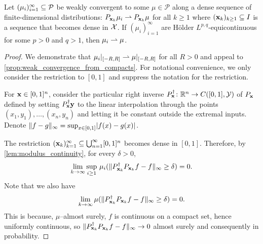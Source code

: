 \documentclass[12pt]{report}
\begin{document}
\begin{proposition} \label{prop:weak_convergence_from_fdds}
    Let $(\mu_i)_{i=1}^\infty \subseteq \mathcal{P}$ be weakly convergent to some $\mu \in \mathcal{P}$ along a dense sequence of finite-dimensional distributions: $P_{\mathbf{x}_k} \mu_i \rightharpoonup P_{\mathbf{x}_k} \mu$ for all $k \ge 1$ where $(\mathbf{x}_k)_{k \ge 1} \subseteq I$ is a sequence that becomes dense in $\mathcal{X}$.
    If $(\mu_i)_{i=1}^\infty$ are H\"older $L^{p,q}$-equicontinuous for some $p > 0$ and $q > 1$, then $\mu_i \rightharpoonup \mu$.
\end{proposition}
\begin{proof}
    We demonstrate that $\mu_i|_{[-R, R]} \rightharpoonup \mu|_{[-R, R]}$ for all $R > 0$ and appeal to \cref{prop:weak_convergence_from_compacts}.
    For notational convenience, we only consider the restriction to $[0, 1]$ and suppress the notation for the restriction.

    For $\mathbf{x} \in [0, 1]^n$, consider the particular right inverse $P_{\mathbf{x}}^\dagger \colon \mathbb{R}^n \to C([0, 1], \mathcal{Y})$ of $P_{\mathbf{x}}$ defined by setting $P_{\mathbf{x}}^\dagger \mathbf{y}$ to the linear interpolation through the points $(x_1,y_1), \ldots, (x_n, y_n)$ and letting it be constant outside the extremal inputs.
    Denote $\lVert f - g\rVert_\infty = \operatorname*{sup}_{x\in [0, 1]} \lvert f(x) - g(x)\rvert$.

    The restriction $(\mathbf{x}_k)_{k = 1}^\infty \subseteq \bigcup_{n=1}^\infty [0, 1]^n$ becomes dense in $[0, 1]$.
    Therefore, by \cref{lem:modulus_continuity}, for every $\delta > 0$,
    \begin{equation}
        \lim_{k \to \infty} \operatorname*{sup}_{i \ge 1}\, \mu_i(\lVert P_{\mathbf{x}_k}^\dagger P_{\mathbf{x}_k} f - f\rVert_\infty \ge \delta) = 0.
    \end{equation}
    Note that we also have
    \begin{equation}
        \lim_{k \to \infty} \mu(\lVert P_{\mathbf{x}_k}^\dagger P_{\mathbf{x}_k} f - f\rVert_\infty \ge \delta) = 0.
    \end{equation}
    This is because, $\mu$--almost surely, $f$ is continuous on a compact set, hence uniformly continuous, so $\lVert P_{\mathbf{x}_k}^\dagger P_{\mathbf{x}_k} f - f\rVert_\infty \to 0$ almost surely and consequently in probability.


\end{proof}
\end{document}
